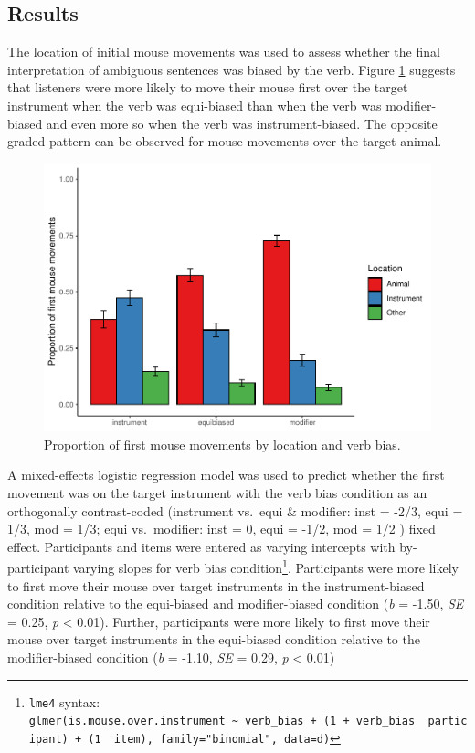 \documentclass[
  man,floatsintext]{apa6}
\begin{document}
\subsection{Results}\label{results-4}

The location of initial mouse movements was used to assess whether the final interpretation of ambiguous sentences was biased by the verb. Figure \ref{fig:E4-mouse-moves-fig} suggests that listeners were more likely to move their mouse first over the target instrument when the verb was equi-biased than when the verb was modifier-biased and even more so when the verb was instrument-biased. The opposite graded pattern can be observed for mouse movements over the target animal.

\begin{figure}
\centering
\includegraphics{manuscript_files/figure-latex/E4-mouse-moves-fig-1.pdf}
\caption{\label{fig:E4-mouse-moves-fig}Proportion of first mouse movements by location and verb bias.}
\end{figure}

A mixed-effects logistic regression model was used to predict whether the first movement was on the target instrument with the verb bias condition as an orthogonally contrast-coded (instrument vs.~equi \& modifier: inst = -2/3, equi = 1/3, mod = 1/3; equi vs.~modifier: inst = 0, equi = -1/2, mod = 1/2 ) fixed effect. Participants and items were entered as varying intercepts with by-participant varying slopes for verb bias condition\footnote{\texttt{lme4} syntax: \texttt{glmer(is.mouse.over.instrument\ \textasciitilde{}\ verb\_bias\ +\ (1\ +\ verb\_bias\ \textbar{}\ participant)\ +\ (1\ \textbar{}\ item),\ family="binomial",\ data=d)}}. Participants were more likely to first move their mouse over target instruments in the instrument-biased condition relative to the equi-biased and modifier-biased condition (\emph{b} = -1.50, \emph{SE} = 0.25, \emph{p} \textless{} 0.01). Further, participants were more likely to first move their mouse over target instruments in the equi-biased condition relative to the modifier-biased condition (\emph{b} = -1.10, \emph{SE} = 0.29, \emph{p} \textless{} 0.01)
\end{document}

